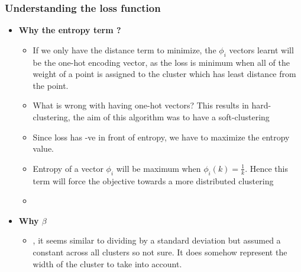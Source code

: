 \documentclass{article}
\begin{document}
\subsubsection{Understanding the loss function}
\begin{itemize}
    \item \textbf{Why the entropy term ?}
        \begin{itemize}
            \item If we only have the distance term to minimize, the $\phi_i$ vectors learnt will be the one-hot encoding vector, as the loss is minimum when all of the weight of a point is assigned to the cluster which has least distance from the point.
            \item What is wrong with having one-hot vectors? This results in hard-clustering, the aim of this algorithm was to have a soft-clustering
            \item Since loss has -ve in front of entropy, we have to maximize the entropy value.
            \item Entropy of a vector $\phi_i$ will be maximum when $\phi_i(k)=\frac{1}{k}$. Hence this term will force the objective towards a more distributed clustering
            \item {}
        \end{itemize}
    \item \textbf{Why $\beta$}
        \begin{itemize}
            \item {}, it seems similar to dividing by a standard deviation but assumed a constant across all clusters so not sure. It does somehow represent the width of the cluster to take into account.
        \end{itemize}
\end{itemize}
\end{document}
